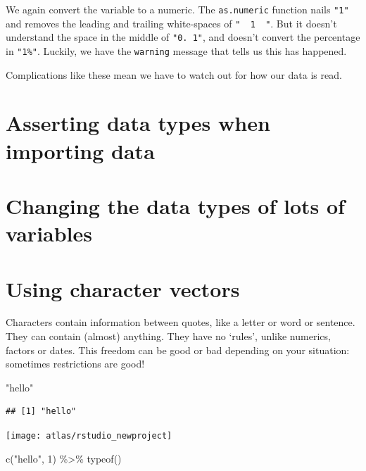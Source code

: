 \documentclass[
]{book}
\newenvironment{Shaded}{\begin{snugshade}}{\end{snugshade}}
\newcommand{\DecValTok}[1]{\textcolor[rgb]{0.00,0.00,0.81}{#1}}
\newcommand{\FunctionTok}[1]{\textcolor[rgb]{0.00,0.00,0.00}{#1}}
\newcommand{\NormalTok}[1]{#1}
\newcommand{\SpecialCharTok}[1]{\textcolor[rgb]{0.00,0.00,0.00}{#1}}
\newcommand{\StringTok}[1]{\textcolor[rgb]{0.31,0.60,0.02}{#1}}
\begin{document}
We again convert the variable to a numeric. The \texttt{as.numeric} function nails \texttt{"1"} and removes the leading and trailing white-spaces of \texttt{"\ \ 1\ \ "}. But it doesn't understand the space in the middle of \texttt{"0.\ 1"}, and doesn't convert the percentage in \texttt{"1\%"}. Luckily, we have the \texttt{warning} message that tells us this has happened.

Complications like these mean we have to watch out for how our data is read.

\hypertarget{asserting-data-types-when-importing-data}{%
\section{Asserting data types when importing data}\label{asserting-data-types-when-importing-data}}

\hypertarget{changing-the-data-types-of-lots-of-variables}{%
\section{Changing the data types of lots of variables}\label{changing-the-data-types-of-lots-of-variables}}

\hypertarget{using-character-vectors}{%
\section{Using character vectors}\label{using-character-vectors}}

Characters contain information between quotes, like a letter or word or sentence. They can contain (almost) anything. They have no `rules', unlike numerics, factors or dates. This freedom can be good or bad depending on your situation: sometimes restrictions are good!

\begin{Shaded}
\begin{Highlighting}[]
\StringTok{"hello"}
\end{Highlighting}
\end{Shaded}

\begin{verbatim}
## [1] "hello"
\end{verbatim}

\begin{center}\texttt{[image: atlas/rstudio\_newproject]} \end{center}

\begin{Shaded}
\begin{Highlighting}[]
\FunctionTok{c}\NormalTok{(}\StringTok{"hello"}\NormalTok{, }\DecValTok{1}\NormalTok{) }\SpecialCharTok{\%\textgreater{}\%} \FunctionTok{typeof}\NormalTok{()}
\end{Highlighting}
\end{Shaded}
\end{document}
